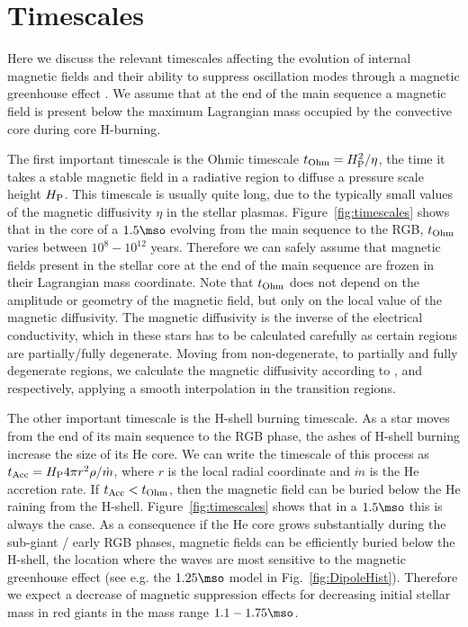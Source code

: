 \section{Timescales}
\label{time}

Here we discuss the relevant timescales affecting the evolution of internal magnetic fields and their ability to 
suppress oscillation modes through a magnetic greenhouse effect \citep{Fuller_2015}.
We assume that at the end of the main sequence a magnetic field is present below the maximum Lagrangian mass occupied by the convective core during core H-burning.

The first important timescale is the Ohmic timescale $t_{\rm Ohm}= H_{\rm P}^2/\eta$, the time it takes a stable magnetic field in a radiative region to diffuse a pressure scale height $H_{\rm P}$. This timescale is usually quite long, due to the typically  small values of the magnetic diffusivity $\eta$ in the stellar plasmas. Figure~\ref{fig:timescales} shows that in the core of a $1.5\mso$ evolving from the main sequence to the RGB,  $t_{\rm Ohm}$ varies between $10^8-10^{12}$ years. Therefore we can safely assume that magnetic fields present in the stellar core at the end of the main sequence are frozen in their Lagrangian mass coordinate.
Note that  $t_{\rm Ohm}$ does not depend on the amplitude or geometry of the magnetic field, but only on the local value of the magnetic diffusivity. The magnetic diffusivity is the inverse of the electrical conductivity,  which in these stars has to be calculated carefully as certain regions are partially/fully degenerate. Moving from non-degenerate, to partially and fully degenerate regions, we calculate the magnetic diffusivity according to ,  and  respectively, applying a smooth interpolation in the transition regions.

The other important timescale is the H-shell burning timescale. As a star moves from the end of its main sequence to the RGB phase, the ashes of H-shell burning increase the size of its He core. We can write the timescale of this process as $t_{\rm Acc} = H_{\rm P} 4\pi r^2 \rho / \dot{m}$, where $r$ is the local radial coordinate and $\dot{m}$ is the He accretion rate. If $t_{\rm Acc} < t_{\rm Ohm}$, then the magnetic field can be buried below the He raining from the H-shell. Figure~\ref{fig:timescales} shows that in a $1.5\mso$ this is always the case. As a consequence if the He core grows substantially during the sub-giant / early RGB phases, magnetic fields can be efficiently buried below the H-shell, the location where the waves are most sensitive to the magnetic greenhouse effect (see e.g. the $1.25\mso$ model in                  Fig.~\ref{fig:DipoleHist}). Therefore we expect a decrease of magnetic suppression effects for decreasing initial stellar mass in red giants in the mass range $1.1-1.75\mso$.

